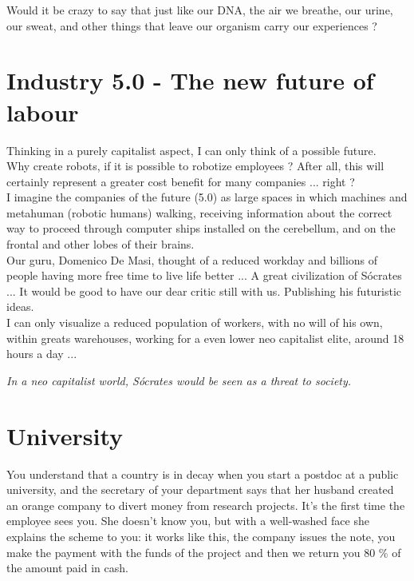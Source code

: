 \documentclass[11pt]{book}
\begin{document}
\noindent Would it be crazy to say that just like our DNA, the air we breathe, our urine, our sweat, and other things that leave our organism carry our experiences ?

\chapter{Industry 5.0 - The new future of labour}

\noindent Thinking in a purely capitalist aspect, I can only think of a possible future. \\

\noindent Why create robots, if it is possible to robotize employees ? After all, this will certainly represent a greater cost benefit for many companies ... right ? \\

\noindent I imagine the companies of the future (5.0) as large spaces in which machines and metahuman (robotic humans) walking, receiving information about the correct way to proceed through computer ships installed on the cerebellum, and on the frontal and other lobes of their brains. \\

\noindent Our guru, Domenico De Masi, thought of a reduced workday and billions of people having more free time to live life better ... A great civilization of Sócrates ... It would be good to have our dear critic still with us. Publishing his futuristic ideas. \\

\noindent I can only visualize a reduced population of workers, with no will of his own, within greats warehouses, working for a even lower neo capitalist elite, around 18 hours a day ...

\noindent \begin{center} \emph{In a neo capitalist world, Sócrates would be seen as a threat to society.} \end{center}

\chapter{University}

\noindent You understand that a country is in decay when you start a postdoc at a public university, and the secretary of your department says that her husband created an orange company to divert money from research projects. It's the first time the employee sees you. She doesn't know you, but with a well-washed face she explains the scheme to you: it works like this, the company issues the note, you make the payment with the funds of the project and then we return you 80 \% of the amount paid in cash. \\
\end{document}
